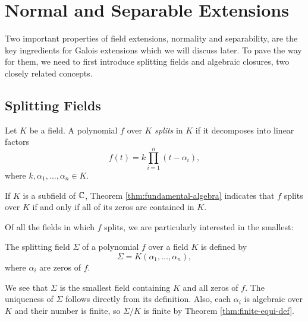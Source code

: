 \section{Normal and Separable Extensions}

Two important properties of field extensions, normality and separability, are the key ingredients for Galois extensions which we will discuss later. To pave the way for them, we need to first introduce splitting fields and algebraic closures, two closely related concepts. 

\subsection{Splitting Fields}
\begin{definition}
    Let $K$ be a field. A polynomial $f$ over $K$ \textit{splits} in $K$ if it decomposes into linear factors $$
    f(t) = k \prod _{i=1} ^n (t - \alpha_i),
    $$
    where $k, \alpha_1, \ldots, \alpha_n \in K$. 
\end{definition}
If $K$ is a subfield of $\mathbb C$, Theorem \ref{thm:fundamental-algebra} indicates that $f$ splits over $K$ if and only if all of its zeros are contained in $K$. 

Of all the fields in which $f$ splits, we are particularly interested in the smallest:

\begin{definition}
    The splitting field $\Sigma$ of a polynomial $f$ over a field $K$ is defined by $$\Sigma = K(\alpha_1, \ldots, \alpha_n), $$ where $\alpha_i$ are zeros of $f$. 
\end{definition}

We see that $\Sigma$ is the smallest field containing $K$ and all zeros of $f$. The uniqueness of $\Sigma$ follows directly from its definition. Also, each $\alpha_i$ is algebraic over $K$ and their number is finite, so $\Sigma / K$ is finite by Theorem \ref{thm:finite-equi-def}. 

